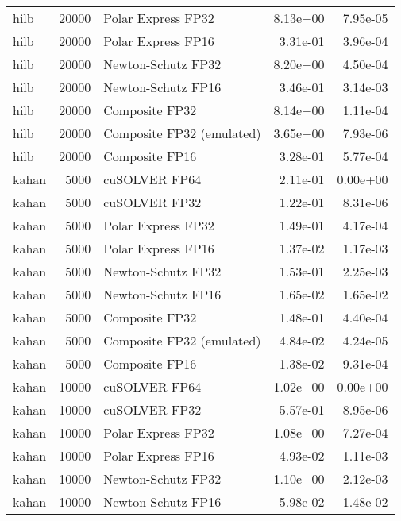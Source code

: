 \begin{table}
\begin{tabular}{lrlrr}
     hilb & 20000 &        Polar Express FP32 &  8.13e+00 &        7.95e-05 \\
     hilb & 20000 &        Polar Express FP16 &  3.31e-01 &        3.96e-04 \\
     hilb & 20000 &        Newton-Schutz FP32 &  8.20e+00 &        4.50e-04 \\
     hilb & 20000 &        Newton-Schutz FP16 &  3.46e-01 &        3.14e-03 \\
     hilb & 20000 &            Composite FP32 &  8.14e+00 &        1.11e-04 \\
     hilb & 20000 & Composite FP32 (emulated) &  3.65e+00 &        7.93e-06 \\
     hilb & 20000 &            Composite FP16 &  3.28e-01 &        5.77e-04 \\
    kahan &  5000 &             cuSOLVER FP64 &  2.11e-01 &        0.00e+00 \\
    kahan &  5000 &             cuSOLVER FP32 &  1.22e-01 &        8.31e-06 \\
    kahan &  5000 &        Polar Express FP32 &  1.49e-01 &        4.17e-04 \\
    kahan &  5000 &        Polar Express FP16 &  1.37e-02 &        1.17e-03 \\
    kahan &  5000 &        Newton-Schutz FP32 &  1.53e-01 &        2.25e-03 \\
    kahan &  5000 &        Newton-Schutz FP16 &  1.65e-02 &        1.65e-02 \\
    kahan &  5000 &            Composite FP32 &  1.48e-01 &        4.40e-04 \\
    kahan &  5000 & Composite FP32 (emulated) &  4.84e-02 &        4.24e-05 \\
    kahan &  5000 &            Composite FP16 &  1.38e-02 &        9.31e-04 \\
    kahan & 10000 &             cuSOLVER FP64 &  1.02e+00 &        0.00e+00 \\
    kahan & 10000 &             cuSOLVER FP32 &  5.57e-01 &        8.95e-06 \\
    kahan & 10000 &        Polar Express FP32 &  1.08e+00 &        7.27e-04 \\
    kahan & 10000 &        Polar Express FP16 &  4.93e-02 &        1.11e-03 \\
    kahan & 10000 &        Newton-Schutz FP32 &  1.10e+00 &        2.12e-03 \\
    kahan & 10000 &        Newton-Schutz FP16 &  5.98e-02 &        1.48e-02 \\

\end{tabular}
\end{table}
